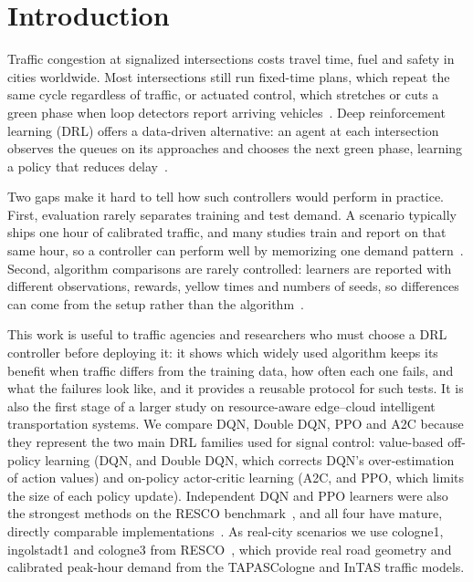 \section{Introduction}
\label{sec:intro}

Traffic congestion at signalized intersections costs travel time, fuel and safety in cities worldwide. Most intersections still run fixed-time plans, which repeat the same cycle regardless of traffic, or actuated control, which stretches or cuts a green phase when loop detectors report arriving vehicles~\cite{michailidis2025review}. Deep reinforcement learning (DRL) offers a data-driven alternative: an agent at each intersection observes the queues on its approaches and chooses the next green phase, learning a policy that reduces delay~\cite{michailidis2025review,mei2024libsignal}.

Two gaps make it hard to tell how such controllers would perform in practice. First, evaluation rarely separates training and test demand. A scenario typically ships one hour of calibrated traffic, and many studies train and report on that same hour, so a controller can perform well by memorizing one demand pattern~\cite{ault2021resco,kwesiga2026robustness}. Second, algorithm comparisons are rarely controlled: learners are reported with different observations, rewards, yellow times and numbers of seeds, so differences can come from the setup rather than the algorithm~\cite{mei2024libsignal,agarwal2021precipice}.

This work is useful to traffic agencies and researchers who must choose a DRL controller before deploying it: it shows which widely used algorithm keeps its benefit when traffic differs from the training data, how often each one fails, and what the failures look like, and it provides a reusable protocol for such tests. It is also the first stage of a larger study on resource-aware edge--cloud intelligent transportation systems. We compare DQN, Double DQN, PPO and A2C because they represent the two main DRL families used for signal control: value-based off-policy learning (DQN, and Double DQN, which corrects DQN's over-estimation of action values) and on-policy actor-critic learning (A2C, and PPO, which limits the size of each policy update). Independent DQN and PPO learners were also the strongest methods on the RESCO benchmark~\cite{ault2021resco}, and all four have mature, directly comparable implementations~\cite{raffin2021sb3}. As real-city scenarios we use cologne1, ingolstadt1 and cologne3 from RESCO~\cite{ault2021resco}, which provide real road geometry and calibrated peak-hour demand from the TAPASCologne and InTAS traffic models.

